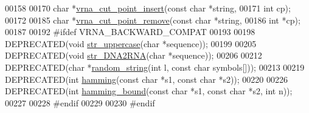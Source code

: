 \begin{DoxyCode}
00158 
00170 \textcolor{keywordtype}{char} *\hyperlink{group__string__utils_ga74f05ece32ea73b59f84a7452afd5fae}{vrna\_cut\_point\_insert}(\textcolor{keyword}{const} \textcolor{keywordtype}{char} *\textcolor{keywordtype}{string},
00171                             \textcolor{keywordtype}{int} cp);
00172 
00185 \textcolor{keywordtype}{char} *\hyperlink{group__string__utils_ga1fbd821d4408cc5f1dd9d12c15e092cb}{vrna\_cut\_point\_remove}(\textcolor{keyword}{const} \textcolor{keywordtype}{char} *\textcolor{keywordtype}{string},
00186                             \textcolor{keywordtype}{int} *cp);
00187 
00192 \textcolor{preprocessor}{#ifdef  VRNA\_BACKWARD\_COMPAT}
00193 
00198 DEPRECATED(\textcolor{keywordtype}{void}  \hyperlink{string__utils_8h_a17b796b806f96b70382077fb5bc519bb}{str\_uppercase}(\textcolor{keywordtype}{char} *sequence));
00199 
00205 DEPRECATED(\textcolor{keywordtype}{void} \hyperlink{string__utils_8h_ad3f18dd83f958f18b2f26ecb99305208}{str\_DNA2RNA}(\textcolor{keywordtype}{char} *sequence));
00206 
00212 DEPRECATED(\textcolor{keywordtype}{char} *\hyperlink{string__utils_8h_a1b95eac365a021572e1c37e5993a89be}{random\_string}(\textcolor{keywordtype}{int} l, \textcolor{keyword}{const} \textcolor{keywordtype}{char} symbols[]));
00213 
00219 DEPRECATED(\textcolor{keywordtype}{int} \hyperlink{string__utils_8h_ad9dc7bfc9aa664dc6698f17ce07fc7e7}{hamming}(\textcolor{keyword}{const} \textcolor{keywordtype}{char} *s1, \textcolor{keyword}{const} \textcolor{keywordtype}{char} *s2));
00220 
00226 DEPRECATED(\textcolor{keywordtype}{int} \hyperlink{string__utils_8h_a96d3c36717d624514055ce201cab1542}{hamming\_bound}(\textcolor{keyword}{const} \textcolor{keywordtype}{char} *s1, \textcolor{keyword}{const} \textcolor{keywordtype}{char} *s2, \textcolor{keywordtype}{int} n));
00227 
00228 \textcolor{preprocessor}{#endif}
00229 
00230 \textcolor{preprocessor}{#endif}
\end{DoxyCode}
